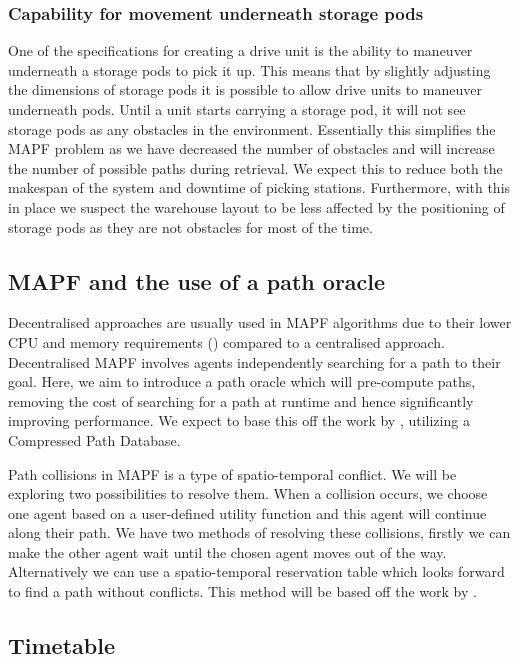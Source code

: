 \documentclass[a4paper,11pt]{article}
\begin{document}
\subsubsection{Capability for movement underneath storage pods}
\label{beneathpods}
One of the specifications for creating a drive unit is the ability to maneuver underneath a storage pods to pick it up. This means that by slightly adjusting the dimensions of storage pods it is possible to allow drive units to maneuver underneath pods. Until a unit starts carrying a storage pod, it will not see storage pods as any obstacles in the environment. Essentially this simplifies the MAPF problem as we have decreased the number of obstacles and will increase the number of possible paths during retrieval. We expect this to reduce both the makespan of the system and downtime of picking stations. Furthermore, with this in place we suspect the warehouse layout to be less affected by the positioning of storage pods as they are not obstacles for most of the time.

\subsection{MAPF and the use of a path oracle}
\label{pathoracle}
Decentralised approaches are usually used in MAPF algorithms due to their lower CPU and memory requirements (\cite{wang2009bridging}) compared to a centralised approach. Decentralised MAPF involves agents independently searching for a path to their goal. Here, we aim to introduce a path oracle which will pre-compute paths, removing the cost of searching for a path at runtime and hence significantly improving performance. We expect to base this off the work by \cite{strasser2015compressing}, utilizing a Compressed Path Database.

Path collisions in MAPF is a type of spatio-temporal conflict. We will be exploring two possibilities to resolve them. When a collision occurs, we choose one agent based on a user-defined utility function and this agent will continue along their path. We have two methods of resolving these collisions, firstly we can make the other agent wait until the chosen agent moves out of the way. Alternatively we can use a spatio-temporal reservation table which looks forward to find a path without conflicts. This method will be based off the work by \cite{wilt2014spatially}.


\subsection{Timetable}
\end{document}
